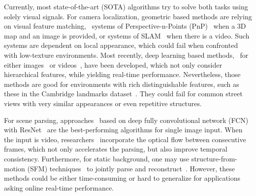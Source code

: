 Currently, most state-of-the-art (SOTA) algorithms try to solve both tasks using solely visual signals.
For camera localization, geometric based methods are relying on visual feature matching, \eg~systems of Perspective-n-Points (PnP)~\cite{haralick1994review,kneip2014upnp,campbell2017globally} when a 3D map and an image is provided, or systems of SLAM~\cite{engel2014lsd,mur2015orb,NewcombeLD11} when there is a video. Such systems are dependent on local appearance, which could fail when confronted with low-texture environments.
Most recently, deep learning based methods, \eg~for either images~\cite{Kendall_2015_ICCV} or videos~\cite{DBLP:journals/corr/ClarkWMTW17}, have been developed, which not only consider hierarchical features, while yielding real-time performance. %
Nevertheless, those methods are good for environments with rich distinguishable features, such as these in the Cambridge landmarks dataset~\cite{Kendall_2015_ICCV}. They could fail for common street views with very similar appearances or even repetitive structures.

For scene parsing, approaches~\cite{ZhaoSQWJ16,ChenPSA17} based on deep fully convolutional network (FCN) with ResNet~\cite{HeZRS15} are the best-performing algorithms for single image input. When the input is video, researchers~\cite{kundu2016feature,zhu2016deep} incorporate the optical flow between consecutive frames, which not only accelerates the parsing, but also improve temporal consistency. Furthermore, for static background, one may use structure-from-motion (SFM) techniques~\cite{wu2011visualsfm} to jointly parse and reconstruct~\cite{kundu2014joint}. However, these methods could be either time-consuming or hard to generalize for applications asking online real-time performance.

